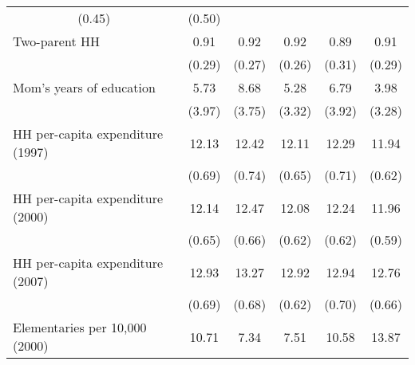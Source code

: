 \begin{tabular}{llllll}
  \multicolumn{1}{c}{(0.45)} &
  \multicolumn{1}{c}{(0.50)} \\
\multicolumn{1}{l}{Two-parent HH} &
  \multicolumn{1}{|c}{0.91} &
  \multicolumn{1}{c}{0.92} &
  \multicolumn{1}{c}{0.92} &
  \multicolumn{1}{c}{0.89} &
  \multicolumn{1}{c}{0.91} \\
\multicolumn{1}{l}{} &
  \multicolumn{1}{|c}{(0.29)} &
  \multicolumn{1}{c}{(0.27)} &
  \multicolumn{1}{c}{(0.26)} &
  \multicolumn{1}{c}{(0.31)} &
  \multicolumn{1}{c}{(0.29)} \\
\multicolumn{1}{l}{Mom's years of education} &
  \multicolumn{1}{|c}{5.73} &
  \multicolumn{1}{c}{8.68} &
  \multicolumn{1}{c}{5.28} &
  \multicolumn{1}{c}{6.79} &
  \multicolumn{1}{c}{3.98} \\
\multicolumn{1}{l}{} &
  \multicolumn{1}{|c}{(3.97)} &
  \multicolumn{1}{c}{(3.75)} &
  \multicolumn{1}{c}{(3.32)} &
  \multicolumn{1}{c}{(3.92)} &
  \multicolumn{1}{c}{(3.28)} \\
\multicolumn{1}{l}{HH per-capita expenditure (1997)} &
  \multicolumn{1}{|c}{12.13} &
  \multicolumn{1}{c}{12.42} &
  \multicolumn{1}{c}{12.11} &
  \multicolumn{1}{c}{12.29} &
  \multicolumn{1}{c}{11.94} \\
\multicolumn{1}{l}{} &
  \multicolumn{1}{|c}{(0.69)} &
  \multicolumn{1}{c}{(0.74)} &
  \multicolumn{1}{c}{(0.65)} &
  \multicolumn{1}{c}{(0.71)} &
  \multicolumn{1}{c}{(0.62)} \\
\multicolumn{1}{l}{HH per-capita expenditure (2000)} &
  \multicolumn{1}{|c}{12.14} &
  \multicolumn{1}{c}{12.47} &
  \multicolumn{1}{c}{12.08} &
  \multicolumn{1}{c}{12.24} &
  \multicolumn{1}{c}{11.96} \\
\multicolumn{1}{l}{} &
  \multicolumn{1}{|c}{(0.65)} &
  \multicolumn{1}{c}{(0.66)} &
  \multicolumn{1}{c}{(0.62)} &
  \multicolumn{1}{c}{(0.62)} &
  \multicolumn{1}{c}{(0.59)} \\
\multicolumn{1}{l}{HH per-capita expenditure (2007)} &
  \multicolumn{1}{|c}{12.93} &
  \multicolumn{1}{c}{13.27} &
  \multicolumn{1}{c}{12.92} &
  \multicolumn{1}{c}{12.94} &
  \multicolumn{1}{c}{12.76} \\
\multicolumn{1}{l}{} &
  \multicolumn{1}{|c}{(0.69)} &
  \multicolumn{1}{c}{(0.68)} &
  \multicolumn{1}{c}{(0.62)} &
  \multicolumn{1}{c}{(0.70)} &
  \multicolumn{1}{c}{(0.66)} \\
\multicolumn{1}{l}{Elementaries per 10,000 (2000)} &
  \multicolumn{1}{|c}{10.71} &
  \multicolumn{1}{c}{7.34} &
  \multicolumn{1}{c}{7.51} &
  \multicolumn{1}{c}{10.58} &
  \multicolumn{1}{c}{13.87} \\

\end{tabular}
